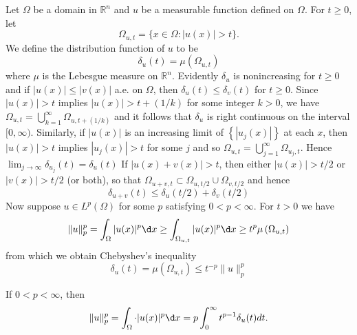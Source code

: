 \begin{para}
  Let $\Omega$ be a domain in $\mathbb{R}^n$ and $u$ be a measurable function defined on $\Omega$. For $t \geq 0$, let
  \[
  \Omega_{u, t}=\{x \in \Omega:|u(x)|>t\} .
  \]
  We define the distribution function of $u$ to be
  \[
 \delta_u(t)=\mu\left(\Omega_{u, t}\right)
  \]
  where $\mu$ is the Lebesgue measure on $\mathbb{R}^n$. Evidently $\delta_u$ is nonincreasing for $t \geq 0$ and if $|u(x)| \leq|v(x)|$ a.e. on $\Omega$, then $\delta_u(t) \leq \delta_v(t)$ for $t \geq 0$.
  Since $|u(x)|>t$ implies $|u(x)|>t+(1 / k)$ for some integer $k>0$, we have $\Omega_{u, t}=\bigcup_{k=1}^{\infty} \Omega_{u, t+(1 / k)}$ and it follows that $\delta_u$ is right continuous on the interval $[0, \infty)$. Similarly, if $|u(x)|$ is an increasing limit of $\left\{\left|u_j(x)\right|\right\}$ at each $x$, then $|u(x)|>t$ implies $\left|u_j(x)\right|>t$ for some $j$ and so $\Omega_{u, t}=\bigcup_{j=1}^{\infty} \Omega_{u_j, t}$. Hence
  $\lim _{j \rightarrow \infty} \delta_{u_j}(t)=\delta_u(t)$
  If $|u(x)+v(x)|>t$, then either $|u(x)|>t / 2$ or $|v(x)|>t / 2$ (or both), so that $\Omega_{u+v, t} \subset \Omega_{u, t / 2} \cup \Omega_{v, t / 2}$ and hence
  \[
 \delta_{u+v}(t) \leq \delta_u(t / 2)+\delta_v(t / 2)
  \]
  Now suppose $u \in L^p(\Omega)$ for some $p$ satisfying $0<p<\infty$. For $t>0$ we have
  \[
  \|u\|_p^p=\int_{\Omega}|u(x)|^p \d x \geq \int_{\Omega_{u, t}}|u(x)|^p \d x \geq t^p \mu\left(\Omega_{u, t}\right)
  \]
  from which we obtain Chebyshev's inequality
  \[
 \delta_u(t)=\mu\left(\Omega_{u, t}\right) \leq t^{-p}\|u\|_p^p
  \]
\end{para}


\begin{lemma}
  If $0<p<\infty$, then
  \begin{equation}\label{eq:2.43}
    \|u\|_p^p=\int_{\Omega} \cdot|u(x)|^p \d x=p \int_0^{\infty} t^{p-1} \delta_u(t) d t.  
  \end{equation}
\end{lemma}

